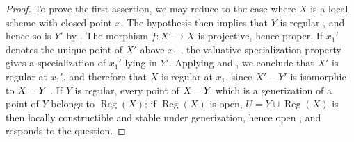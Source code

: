 \begin{proof}
To prove the first assertion, we may reduce to the case where $X$ is a local scheme with closed point $x$. The hypothesis then implies that $Y$ is regular , and hence so is $Y'$ by .
The morphism $f:X'\to X$ is projective, hence proper. If $x_1'$ denotes the unique point of $X'$ above $x_1$ , the valuative specialization property  gives a specialization of $x_1'$ lying in $Y'$. Applying  and , we conclude that $X'$ is regular at $x_1'$, and therefore that $X$ is regular at $x_1$, since $X'-Y'$ is isomorphic to $X- Y$ .
If $Y$ is regular, every point of $X- Y$ which is a generization of a point of $Y$ belongs to $\operatorname{Reg}(X)$; if $\operatorname{Reg}(X)$ is open, $U=Y\cup\operatorname{Reg}(X)$ is then locally constructible and stable under generization, hence open , and responds to the question.
\end{proof}

